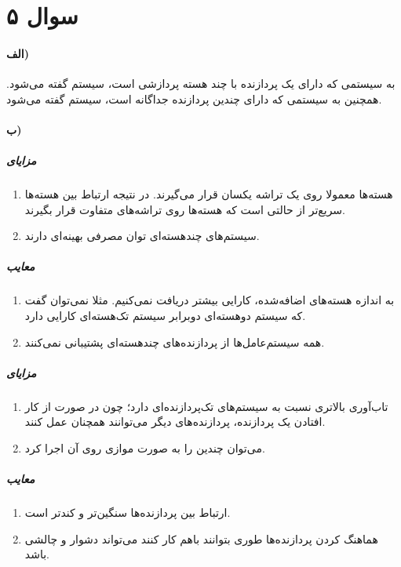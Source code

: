 \documentclass{article}
\begin{document}
	\section*{سوال ۵}

	\paragraph*{الف)}

	به سیستمی که دارای یک پردازنده با چند هسته پردازشی است، سیستم
	گفته می‌شود. همچنین به سیستمی که دارای چندین پردازنده جداگانه است، سیستم
	گفته می‌شود.

	\paragraph*{ب)}
	\subparagraph*{مزایای }
	\begin{enumerate}
		\item
		هسته‌ها معمولا روی یک تراشه یکسان قرار می‌گیرند. در نتیجه ارتباط بین هسته‌ها سریع‌تر از حالتی است که هسته‌ها روی تراشه‌های متفاوت قرار بگیرند.

		\item
		سیستم‌های چندهسته‌ای توان مصرفی بهینه‌ای دارند.
	\end{enumerate}

	\subparagraph*{معایب }
	\begin{enumerate}
		\item
		به اندازه هسته‌های اضافه‌شده، کارایی بیشتر دریافت نمی‌کنیم. مثلا نمی‌توان گفت که سیستم دوهسته‌ای دوبرابر سیستم تک‌هسته‌ای کارایی دارد.

		\item
		همه سیستم‌عامل‌ها از پردازنده‌های چندهسته‌ای پشتیبانی نمی‌کنند.
	\end{enumerate}

	\subparagraph*{مزایای }
	\begin{enumerate}
		\item
		تاب‌آوری بالاتری نسبت به سیستم‌های تک‌پردازنده‌ای دارد؛ چون در صورت از کار افتادن یک پردازنده، پردازنده‌های دیگر می‌توانند همچنان عمل کنند.

		\item
		می‌توان چندین
		را به صورت موازی روی آن اجرا کرد.
	\end{enumerate}

	\subparagraph*{معایب }
	\begin{enumerate}
		\item
		ارتباط بین پردازنده‌ها سنگین‌تر و کندتر است.

		\item
		هماهنگ کردن پردازنده‌ها طوری بتوانند باهم کار کنند می‌تواند دشوار و چالشی باشد.
	\end{enumerate}
\end{document}
